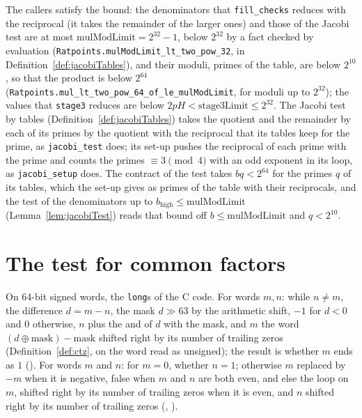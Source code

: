 The callers satisfy the bound: the denominators that \verb|fill_checks| reduces with the reciprocal
(it takes the remainder of the larger ones) and those of the Jacobi test are at most
$\mathrm{mulModLimit} = 2^{32} - 1$, below $2^{32}$ by a fact checked by evaluation
(\verb|Ratpoints.mulModLimit_lt_two_pow_32|, in Definition~\ref{def:jacobiTables}), and their
moduli, primes of the table, are below $2^{10}$, so that the product is below $2^{64}$
(\verb|Ratpoints.mul_lt_two_pow_64_of_le_mulModLimit|, for moduli up to $2^{32}$); the values that
\verb|stage3| reduces are below $2 p H < \mathrm{stage3Limit} \le 2^{32}$. The Jacobi test by tables
(Definition~\ref{def:jacobiTables}) takes the quotient and the remainder by each of its primes by
the quotient with the reciprocal that its tables keep for the prime, as \verb|jacobi_test| does; its
set-up pushes the reciprocal of each prime with the prime and counts the primes $\equiv 3 \pmod 4$
with an odd exponent in its loop, as \verb|jacobi_setup| does. The contract of the test takes $b q <
2^{64}$ for the primes $q$ of its tables, which the set-up gives as primes of the table with their
reciprocals, and the test of the denominators up to $b_{\mathrm{high}} \le \mathrm{mulModLimit}$
(Lemma~\ref{lem:jacobiTest}) reads that bound off $b \le \mathrm{mulModLimit}$ and $q < 2^{10}$.

\section{The test for common factors}\label{sec:relprime}

\begin{definition}\label{def:relprime}
  \leanok
  On 64-bit signed words, the \verb|long|s of the C code. For words $m, n$: while $n \ne m$, the
  difference $d = m - n$, the mask $d \gg 63$ by the arithmetic shift, $-1$ for $d < 0$ and $0$
  otherwise, $n$ plus the and of $d$ with the mask, and $m$ the word $(d \oplus \mathrm{mask}) -
  \mathrm{mask}$ shifted right by its number of trailing zeros (Definition~\ref{def:ctz}, on the
  word read as unsigned); the result is whether $m$ ends as $1$ (). For
  words $m$ and $n$: for $m = 0$, whether $n = 1$; otherwise $m$ replaced by $-m$ when it is
  negative, false when $m$ and $n$ are both even, and else the loop on $m$, shifted right by its
  number of trailing zeros when it is even, and $n$ shifted right by its number of trailing zeros
  (, ).
\end{definition}


